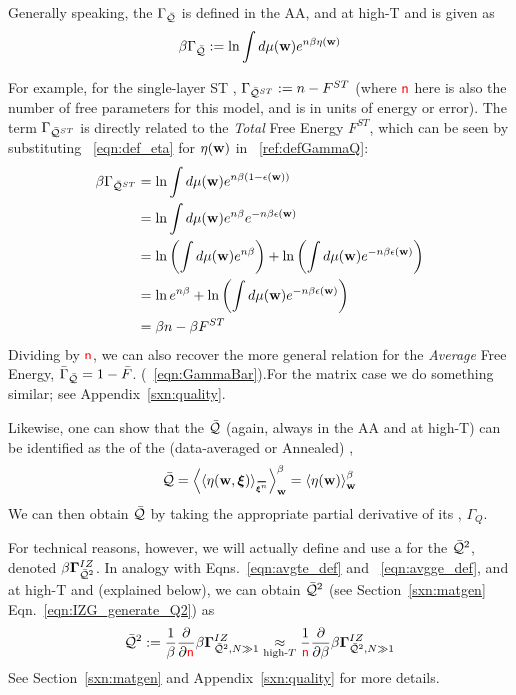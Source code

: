 Generally speaking, the \Quality \GeneratingFunction $\Gamma_{\bar{\mathcal{Q}}}$ is defined in the AA, and at high-T and is given as
\begin{align}
  \label{ref:defGammaQ}
  \beta\Gamma_{\bar{\mathcal{Q}}} := \ln\int d\mu({\mathbf{w}}) e^{n\beta\eta({\mathbf{w}})}
\end{align}

For example, for the single-layer ST \Perceptron, $\Gamma_{\bar{\mathcal{Q}}^{ST}}:=n-F^{ST}$
(where ${\color{red}\sf{n}}$ here is also the number of free parameters for this model, and is in units of energy or error).
The term $\Gamma_{\bar{\mathcal{Q}}^{ST}}$ is directly related to the \emph{Total} Free Energy $F^{ST}$, which can be seen by substituting \EQN~\ref{eqn:def_eta}
for $\eta({\mathbf{w}})$ in \EQN~\ref{ref:defGammaQ}:
\begin{align}
  \label{ref:defGammaQtoF}
  \beta\Gamma_{\bar{\mathcal{Q}}^{ST}}
  &= \ln\int d\mu({\mathbf{w}}) e^{n\beta(1-\epsilon({\mathbf{w}}))} \\ \nonumber
    &= \ln\int d\mu({\mathbf{w}}) e^{n\beta}e^{-n\beta\epsilon({\mathbf{w}})} \\ \nonumber
    &= \ln\left(\int d\mu({\mathbf{w}}) e^{n\beta}\right)+\ln\left(\int d\mu({\mathbf{w}})e^{-n\beta\epsilon({\mathbf{w}})}\right) \\ \nonumber
   &= \ln e^{n\beta}+\ln\left(\int d\mu({\mathbf{w}})e^{-n\beta\epsilon({\mathbf{w}})}\right) \\ \nonumber
  &= \beta n-\beta F^{ST}
\end{align}
Dividing by ${\color{red}\sf{n}}$, we can also recover the more general relation for the \emph{Average} Free Energy,
$\bar{\Gamma}_{\bar{\mathcal{Q}}}=1-\bar{F}$. (\EQN~\ref{eqn:GammaBar}).For the matrix case we do something similar; see Appendix~\ref{sxn:quality}.

Likewise, one can show that the \Quality $\bar{\mathcal{Q}}$
(again, always in the AA and at high-T) can be identified as the \ThermalAverage of the (data-averaged or Annealed)
\SelfOverlap, 
\begin{align}
  \label{eqn:Q_def_eta}
  \Q = \THRMAVGw{\langle\ETA(\WVEC,\XI)\rangle_{\AVGNDXIn}} =\THRMAVGw{\ETA(\WVEC)}
\end{align}
We can then obtain $\bar{\mathcal{Q}}$ by taking the appropriate partial derivative of its \GeneratingFunction, $\Gamma_{Q}$.

For technical reasons, however, we will actually define and use a
\GeneratingFunction for the \AverageLayerQualitySquared $\bar{\mathcal{Q}}^{2}$, denoted $\beta\mathbf{\Gamma}^{IZ}_{\bar{\mathcal{Q}}^{2}}$.
In analogy with Eqns.~\ref{eqn:avgte_def} and ~\ref{eqn:avgge_def}, and at high-T and \LargeN (explained below),
we can obtain $\bar{\mathcal{Q}}^{2}$ (see Section~\ref{sxn:matgen} Eqn.~\ref{eqn:IZG_generate_Q2}) as
\begin{align}
  \label{eqn:QT_def}
  \bar{\mathcal{Q}}^{2} := \frac{1}{\beta}\frac{\partial }{\partial {\color{red}\sf{n}}}\beta\mathbf{\Gamma}^{IZ}_{\bar{\mathcal{Q}}^{2},N\gg 1}
  \underset{\text{high-}T}{\approx}
\frac{1}{{\color{red}\sf{n}}}\frac{\partial }{\partial \beta}\beta\mathbf{\Gamma}^{IZ}_{\bar{\mathcal{Q}}^{2},N\gg 1}
\end{align}
See Section~\ref{sxn:matgen} and Appendix~\ref{sxn:quality} for more details.


